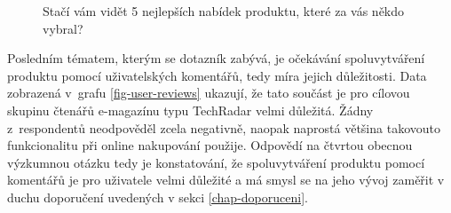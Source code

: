\documentclass[12pt,twoside,openany]{fithesis}
\begin{document}
\begin{figure}[hbt]
    \hypertarget{fig-top-5}{}%
    \begin{center}

\data



\caption[{Stačí vám vidět 5 nejlepších nabídek produktu?}]{Stačí vám vidět 5 nejlepších nabídek produktu, které za vás někdo vybral?}
\label{fig-top-5}
                
\end{center}
\end{figure}

            Posledním tématem, kterým se dotazník zabývá, je 
očekávání spoluvytváření produktu pomocí uživatelských komentářů, 
tedy míra jejich důležitosti. Data zobrazená v~grafu 
\hyperlink{fig-user-reviews}{{\ref{fig-user-reviews}}} ukazují, že tato 
součást je pro cílovou skupinu čtenářů e-magazínu typu TechRadar velmi 
důležitá. Žádny z~respondentů neodpověděl zcela negativně, naopak 
naprostá většina takovouto funkcionalitu při online nakupování použije.
Odpovědí na čtvrtou obecnou výzkumnou otázku tedy je
konstatování, že spoluvytváření produktu pomocí komentářů je pro uživatele
velmi důležité a má smysl se na jeho vývoj zaměřit v duchu 
doporučení uvedených v sekci \hyperlink{chap-doporuceni}{{\ref{chap-doporuceni}}}.
\end{document}
